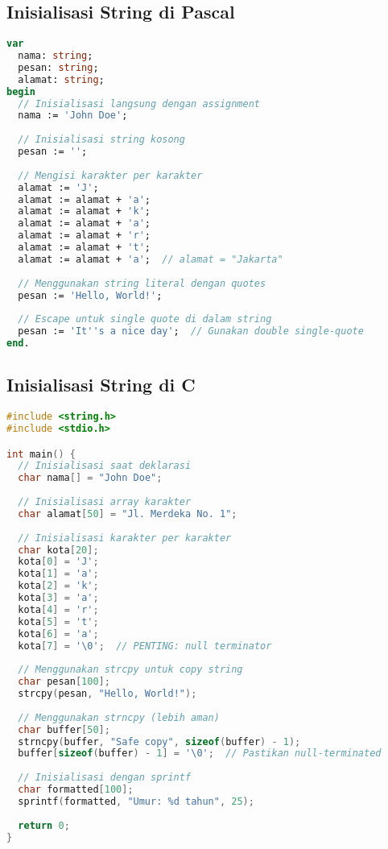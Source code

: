 \documentclass[../main.tex]{subfiles}
\begin{document}
\subsection{Inisialisasi String di Pascal}

\begin{lstlisting}[language=Pascal, caption={Inisialisasi string di Pascal}]
var
  nama: string;
  pesan: string;
  alamat: string;
begin
  // Inisialisasi langsung dengan assignment
  nama := 'John Doe';
  
  // Inisialisasi string kosong
  pesan := '';
  
  // Mengisi karakter per karakter
  alamat := 'J';
  alamat := alamat + 'a';
  alamat := alamat + 'k';
  alamat := alamat + 'a';
  alamat := alamat + 'r';
  alamat := alamat + 't';
  alamat := alamat + 'a';  // alamat = "Jakarta"
  
  // Menggunakan string literal dengan quotes
  pesan := 'Hello, World!';
  
  // Escape untuk single quote di dalam string
  pesan := 'It''s a nice day';  // Gunakan double single-quote
end.
\end{lstlisting}

\subsection{Inisialisasi String di C}

\begin{lstlisting}[language=C, caption={Inisialisasi string di C}]
#include <string.h>
#include <stdio.h>

int main() {
  // Inisialisasi saat deklarasi
  char nama[] = "John Doe";
  
  // Inisialisasi array karakter
  char alamat[50] = "Jl. Merdeka No. 1";
  
  // Inisialisasi karakter per karakter
  char kota[20];
  kota[0] = 'J';
  kota[1] = 'a';
  kota[2] = 'k';
  kota[3] = 'a';
  kota[4] = 'r';
  kota[5] = 't';
  kota[6] = 'a';
  kota[7] = '\0';  // PENTING: null terminator
  
  // Menggunakan strcpy untuk copy string
  char pesan[100];
  strcpy(pesan, "Hello, World!");
  
  // Menggunakan strncpy (lebih aman)
  char buffer[50];
  strncpy(buffer, "Safe copy", sizeof(buffer) - 1);
  buffer[sizeof(buffer) - 1] = '\0';  // Pastikan null-terminated
  
  // Inisialisasi dengan sprintf
  char formatted[100];
  sprintf(formatted, "Umur: %d tahun", 25);
  
  return 0;
}
\end{lstlisting}
\end{document}
